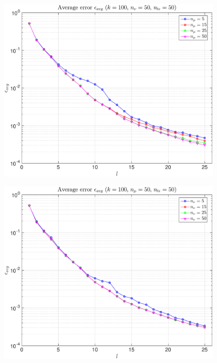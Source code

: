 \documentclass[11pt,a4paper]{article}
\theoremstyle{definition}
\theoremstyle{theorem}
\begin{document}
	\begin{figure}
		\center
		\includegraphics[scale=0.5]{fig33}
		\caption{}
	\end{figure}
	
	\begin{figure}
		\center
		\includegraphics[scale=0.5]{fig34}
		\caption{}
	\end{figure}
	
\end{document}
